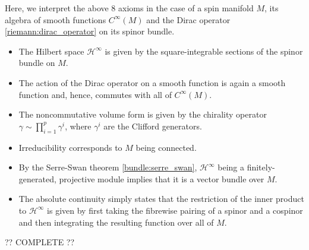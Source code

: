     \begin{example}
        Here, we interpret the above 8 axioms in the case of a spin manifold $M$, its algebra of smooth functions $C^\infty(M)$ and the Dirac operator \ref{riemann:dirac_operator} on its spinor bundle.
        \begin{itemize}
            \item The Hilbert space $\mathcal{H}^\infty$ is given by the square-integrable sections of the spinor bundle on $M$.
            \item The action of the Dirac operator on a smooth function is again a smooth function and, hence, commutes with all of $C^\infty(M)$.
            \item The noncommutative volume form is given by the chirality operator $\gamma\sim\prod_{i=1}^p\gamma^i$, where $\gamma^i$ are the Clifford generators.
            \item Irreducibility corresponds to $M$ being connected.
            \item By the Serre-Swan theorem \ref{bundle:serre_swan}, $\mathcal{H}^\infty$ being a finitely-generated, projective module implies that it is a vector bundle over $M$.
            \item The absolute continuity simply states that the restriction of the inner product to $\mathcal{H}^\infty$ is given by first taking the fibrewise pairing of a spinor and a cospinor and then integrating the resulting function over all of $M$.
        \end{itemize}
        ?? COMPLETE ??
    \end{example}

